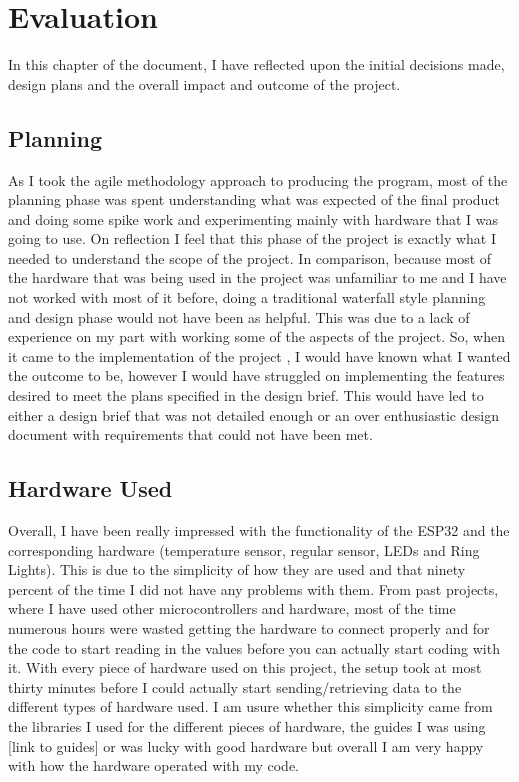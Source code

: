 \chapter{Evaluation}
In this chapter of the document, I have reflected upon the initial decisions made,  design plans and the overall impact and outcome of the project. 

\section{Planning}
As I took the agile methodology approach to producing the program, most of the planning phase was spent understanding what was expected of the final product and doing some spike work and experimenting mainly with hardware that I was going to use. On reflection I feel that this phase of the project is exactly what I needed to understand the scope of the project. In comparison, because most of the hardware that was being used in the project was unfamiliar to me and I have not worked with most of it before, doing a traditional waterfall style planning and design phase would not have been as helpful. This was due to a lack of experience on my part with working some of the aspects of the project. So, when it came to the implementation of the project , I would have known what I wanted the outcome to be, however I would have struggled on implementing the features desired to meet the plans specified in the design brief. This would have led to either a design brief that was not detailed enough or an over enthusiastic design document with requirements that could not have been met.

\section {Hardware Used}
Overall, I have been really impressed with the functionality of the ESP32 and the corresponding hardware (temperature sensor, regular sensor, LEDs and Ring Lights). This is due to the simplicity of how they are used and that ninety percent of the time I did not have any problems with them. From past projects, where I have used other microcontrollers and hardware, most of the time numerous hours were wasted getting the hardware to connect properly and for the code to start reading in the values before you can actually start coding with it. With every piece of hardware used on this project, the setup took at most thirty minutes before I could actually start sending/retrieving data to the different types of hardware used. I am usure whether this simplicity came from the libraries I used for the different pieces of hardware, the guides I was using [link to guides] or was lucky with good hardware but overall I am very happy with how the hardware operated with my code.

